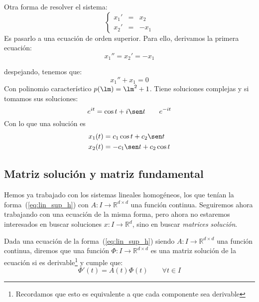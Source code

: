 \begin{ejemplo}
    \noindent
    Otra forma de resolver el sistema:
    \begin{equation*}
        \left\{\begin{array}{rcl}
                x_1' &=& x_2 \\
                x_2' &=& -x_1
        \end{array}\right.
    \end{equation*}
    Es pasarlo a una ecuación de orden superior. Para ello, derivamos la primera ecuación:
    \begin{equation*}
        x_1'' = x_2' = -x_1
    \end{equation*}

    despejando, tenemos que:
    \begin{equation*}
        x_1'' + x_1 = 0
    \end{equation*}
    Con polinomio característico $p(\lm)=\lm^2 + 1$. Tiene soluciones complejas y si tomamos sus soluciones:
    \begin{equation*}
        e^{it}=\cos t + i\sen t \qquad e^{-it}
    \end{equation*}
    Con lo que una solución es
    \begin{align*}
        x_1(t) &= c_1 \cos t + c_2\sen t\\
        x_2(t) &= -c_1\sen t + c_2\cos t
    \end{align*}
\end{ejemplo}

\subsection{Matriz solución y matriz fundamental}
\noindent
Hemos ya trabajado con los sistemas lineales homogéneos, los que tenían la forma~(\ref{eq:lin_sup_h}) con $A:I\rightarrow\mathbb{R}^{d\times d}$ una función continua. Seguiremos ahora trabajando con una ecuación de la misma forma, pero ahora no estaremos interesados en buscar soluciones $x:I\rightarrow\mathbb{R}^d$, sino en buscar \textit{matrices solución}.

\begin{definicion}
    Dada una ecuación de la forma~(\ref{eq:lin_sup_h}) siendo $A:I\rightarrow\mathbb{R}^{d\times d}$ una función continua, diremos que una función $\Phi:I\rightarrow\mathbb{R}^{d\times d}$ es una matriz solución de la ecuación si es derivable\footnote{Recordamos que esto es equivalente a que cada componente sea derivable} y cumple que:
    \begin{equation*}
        \Phi'(t) = A(t)\Phi(t) \qquad \forall t\in I
    \end{equation*}
\end{definicion}

